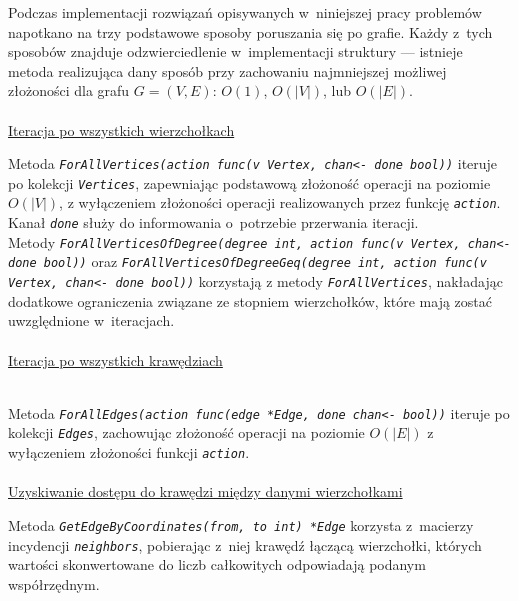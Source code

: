 {  Podczas implementacji rozwiązań opisywanych w~niniejszej pracy problemów napotkano na trzy podstawowe sposoby poruszania się po grafie.
  Każdy z~tych sposobów znajduje odzwierciedlenie w~implementacji struktury --- istnieje metoda realizująca dany sposób przy zachowaniu najmniejszej możliwej złożoności dla grafu $G=(V, E)$: $O(1)$, $O(|V|)$, lub $O(|E|)$.
  \\\\\underline{Iteracja po wszystkich wierzchołkach}\\
  \par{
      Metoda \textit{\lstinline{ForAllVertices(action func(v Vertex, chan<- done bool))}} iteruje po kolekcji \textit{\lstinline{Vertices}}, zapewniając  podstawową złożoność operacji na poziomie $O(|V|)$, z wyłączeniem złożoności operacji realizowanych przez funkcję \textit{\lstinline{action}}. Kanał \textit{\lstinline{done}} służy do informowania o~potrzebie przerwania iteracji.\\
      Metody \textit{\lstinline{ForAllVerticesOfDegree(degree int, action func(v Vertex, chan<- done bool))}} oraz \textit{\lstinline{ForAllVerticesOfDegreeGeq(degree int, action func(v Vertex, chan<- done bool))}} korzystają z metody \textit{\lstinline{ForAllVertices}}, nakładając dodatkowe ograniczenia związane ze stopniem wierzchołków, które mają zostać uwzględnione w~iteracjach.
  }
  \\\\\underline{Iteracja po wszystkich krawędziach}\\\
  \par{
      Metoda \textit{\lstinline{ForAllEdges(action func(edge *Edge, done chan<- bool))}} iteruje po kolekcji \textit{\lstinline{Edges}}, zachowując złożoność operacji na poziomie $O(|E|)$ z wyłączeniem złożoności funkcji \textit{\lstinline{action}}.
  }
  \\\\\underline{Uzyskiwanie dostępu do krawędzi między danymi wierzchołkami}\\
  \par{
      Metoda \textit{\lstinline{GetEdgeByCoordinates(from, to int) *Edge}} korzysta z~macierzy incydencji \textit{\lstinline{neighbors}}, pobierając z~niej krawędź łączącą wierzchołki, których wartości skonwertowane do liczb całkowitych odpowiadają podanym współrzędnym.

}}
